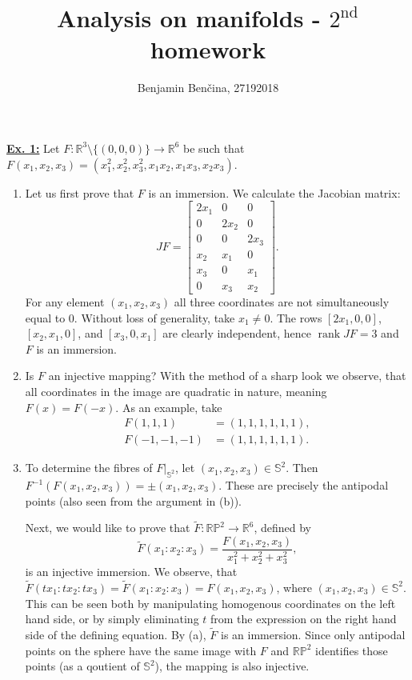 \documentclass[a4paper, 12pt]{article} %
\title{Analysis on manifolds - $2^{\text{nd}}$ homework}
\author{Benjamin Benčina, 27192018}
\DeclareMathOperator{\rank}{rank}
\renewcommand{\S}{\mathbb{S}}
\newcommand{\R}{\mathbb{R}}
\renewcommand{\P}{\mathbb{P}}
\begin{document}
\maketitle

\underline{\textbf{Ex. 1:}}
Let $F\colon\R^3\setminus\lbrace(0, 0, 0)\rbrace \to \R^6$ be such that $F(x_1, x_2, x_3) = (x_1^2, x_2^2, x_3^2, x_1 x_2, x_1 x_3, x_2 x_3)$.

\begin{enumerate}[label=(\alph*)]
	\item Let us first prove that $F$ is an immersion. We calculate the Jacobian matrix:
	\[ JF =
	\begin{bmatrix}
	2x_1 & 0 & 0 \\
	0 & 2x_2 & 0 \\
	0 & 0 & 2x_3 \\
	x_2 & x_1 & 0 \\
	x_3 & 0 & x_1 \\
	0 & x_3 & x_2
	\end{bmatrix}.
	\]
	For any element $(x_1, x_2, x_3)$ all three coordinates are not simultaneously equal to $0$. Without loss of generality, take $x_1 \neq 0$. The rows $[2x_1, 0, 0]$, $[x_2, x_1, 0]$, and $[x_3, 0, x_1]$ are clearly independent, hence $\rank JF = 3$ and $F$ is an immersion.
	
	\item Is $F$ an injective mapping? With the method of a sharp look we observe, that all coordinates in the image are quadratic in nature, meaning $F(x) = F(-x)$. As an example, take
	\begin{align*}
	F(1, 1, 1) &= (1, 1, 1, 1, 1, 1), \\
	F(-1, -1, -1) &= (1, 1, 1, 1, 1, 1).
	\end{align*}
	\item To determine the fibres of $F|_{\S^2}$, let $(x_1, x_2, x_3) \in \S^2$. Then $F^{-1}(F(x_1, x_2, x_3)) = \pm (x_1, x_2, x_3)$. These are precisely the antipodal points (also seen from the argument in (b)).
	
	Next, we would like to prove that $\widetilde{F}\colon\R\P^2 \to \R^6$, defined by
	\[
	\widetilde{F}(x_1:x_2:x_3) = \frac{F(x_1, x_2, x_3)}{x_1^2 + x_2^2 + x_3^2},
	\]
	is an injective immersion.
	We observe, that $\widetilde{F}(tx_1:tx_2:tx_3) = \widetilde{F}(x_1:x_2:x_3) = F(x_1, x_2, x_3)$, where $(x_1, x_2, x_3) \in \S^2$. This can be seen both by manipulating homogenous coordinates on the left hand side, or by simply eliminating $t$ from the expression on the right hand side of the defining equation. By (a), $\widetilde{F}$ is an immersion. Since only antipodal points on the sphere have the same image with $F$ and $\R\P^2$ identifies those points (as a qoutient of $\S^2$), the mapping is also injective.
\end{enumerate}
\end{document}
